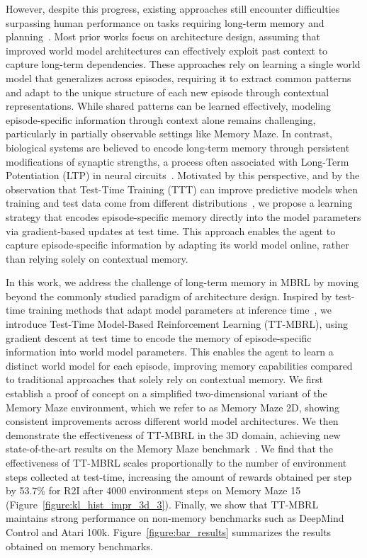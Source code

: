 However, despite this progress, existing approaches still encounter difficulties surpassing human performance on tasks requiring long-term memory and planning~\citep{samsami2024mastering}. Most prior works focus on architecture design, assuming that improved world model architectures can effectively exploit past context to capture long-term dependencies. These approaches rely on learning a single world model that generalizes across episodes, requiring it to extract common patterns and adapt to the unique structure of each new episode through contextual representations. While shared patterns can be learned effectively, modeling episode-specific information through context alone remains challenging, particularly in partially observable settings like Memory Maze. In contrast, biological systems are believed to encode long-term memory through persistent modifications of synaptic strengths, a process often associated with Long-Term Potentiation (LTP) in neural circuits~\citep{bliss1993synaptic}. Motivated by this perspective, and by the observation that Test-Time Training (TTT) can improve predictive models when training and test data come from different distributions~\citep{sun2020test}, we propose a learning strategy that encodes episode-specific memory directly into the model parameters via gradient-based updates at test time. This approach enables the agent to capture episode-specific information by adapting its world model online, rather than relying solely on contextual memory.

In this work, we address the challenge of long-term memory in MBRL by moving beyond the commonly studied paradigm of architecture design. Inspired by test-time training methods that adapt model parameters at inference time~\citep{sun2020test, gandelsman2022test, wang2025test}, we introduce Test-Time Model-Based Reinforcement Learning (TT-MBRL), using gradient descent at test time to encode the memory of episode-specific information into world model parameters. This enables the agent to learn a distinct world model for each episode, improving memory capabilities compared to traditional approaches that solely rely on contextual memory. We first establish a proof of concept on a simplified two-dimensional variant of the Memory Maze environment, which we refer to as Memory Maze 2D, showing consistent improvements across different world model architectures. We then demonstrate the effectiveness of TT-MBRL in the 3D domain, achieving new state-of-the-art results on the Memory Maze benchmark~\citep{pasukonis2023evaluating}. We find that the effectiveness of TT-MBRL scales proportionally to the number of environment steps collected at test-time, increasing the amount of rewards obtained per step by 53.7\% for R2I after 4000 environment steps on Memory Maze 15 (Figure~\ref{figure:kl_hist_impr_3d_3}). Finally, we show that TT-MBRL maintains strong performance on non-memory benchmarks such as DeepMind Control and Atari 100k. Figure~\ref{figure:bar_results} summarizes the results obtained on memory benchmarks.